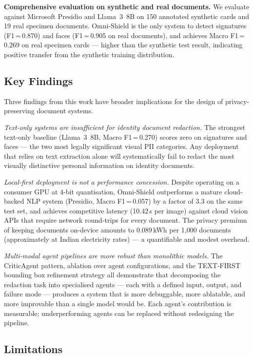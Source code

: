 \textbf{Comprehensive evaluation on synthetic and
real documents.}
We evaluate against Microsoft Presidio and Llama~3~8B
on 150 annotated synthetic cards and 19 real specimen
documents.
Omni-Shield is the only system to detect signatures
(F1\,=\,0.870) and faces (F1\,=\,0.905 on real
documents), and achieves Macro F1\,=\,0.269 on real
specimen cards --- higher than the synthetic test
result, indicating positive transfer from the
synthetic training distribution.

\subsection*{Key Findings}

Three findings from this work have broader implications
for the design of privacy-preserving document systems.

\emph{Text-only systems are insufficient for identity
document redaction.}
The strongest text-only baseline (Llama~3~8B,
Macro F1\,=\,0.270) scores zero on signatures and
faces --- the two most legally significant visual PII
categories.
Any deployment that relies on text extraction alone
will systematically fail to redact the most visually
distinctive personal information on identity documents.

\emph{Local-first deployment is not a performance
concession.}
Despite operating on a consumer GPU at 4-bit
quantisation, Omni-Shield outperforms a mature
cloud-backed NLP system (Presidio, Macro F1\,=\,0.057)
by a factor of 3.3 on the same test set, and
achieves competitive latency (10.42\,s per image)
against cloud vision APIs that require network
round-trips for every document.
The privacy premium of keeping documents on-device
amounts to 0.089\,kWh per 1,000 documents
(approximately  at Indian electricity
rates) --- a quantifiable and modest overhead.

\emph{Multi-modal agent pipelines are more robust
than monolithic models.}
The CriticAgent pattern, ablation over agent
configurations, and the TEXT-FIRST bounding box
refinement strategy all demonstrate that decomposing
the redaction task into specialised agents --- each
with a defined input, output, and failure mode ---
produces a system that is more debuggable,
more ablatable, and more improvable than a
single model would be.
Each agent's contribution is measurable; underperforming
agents can be replaced without redesigning the pipeline.

\subsection*{Limitations}

